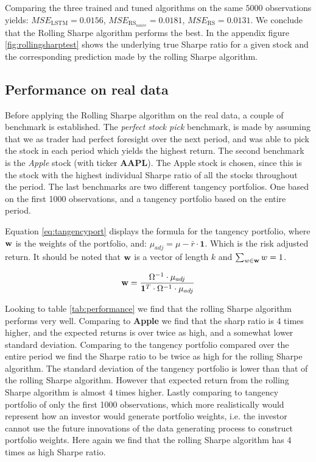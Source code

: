 Comparing the three trained and tuned algorithms on the same $5000$ observations yields: $MSE_{\text{LSTM}}= 0.0156$, $MSE_{\text{RS}_{naive}}= 0.0181$, $MSE_{\text{RS}}= 0.0131$. We conclude that the Rolling Sharpe algorithm performs the best. In the appendix figure \ref{fig:rollingsharptest} shows the underlying true Sharpe ratio for a given stock and the corresponding prediction made by the rolling Sharpe algorithm.


\subsection{Performance on real data}

Before applying the Rolling Sharpe algorithm on the real data, a couple of benchmark is established. The \textit{perfect stock pick} benchmark, is made by assuming that we as trader had perfect foresight over the next period, and was able to pick the stock in each period which yields the highest return. The second benchmark is the \textit{Apple} stock (with ticker \textbf{AAPL}). The Apple stock is chosen, since this is the stock with the highest individual Sharpe ratio of all the stocks throughout the period. The last benchmarks are two different tangency portfolios. One based on the first 1000 observations, and a tangency portfolio based on the entire period.

Equation \ref{eq:tangencyport} displays the formula for the tangency portfolio, where $\mathbf{w}$ is the weights of the portfolio, and: $\mu_{adj} = \mu - \bar{r}\cdot \mathbf{1}$. Which is the risk adjusted return. It should be noted that $\mathbf{w}$ is a vector of length $k$ and $\sum_{w \in \mathbf{w}} w = 1$.

\begin{equation}\label{eq:tangencyport}
    \mathbf{w} = \frac{\Omega^{-1} \cdot \mu_{adj}}{\mathbf{1}^{T} \cdot \Omega^{-1} \cdot \mu_{adj}}
\end{equation}

Looking to table \ref{tab:performance} we find that the rolling Sharpe algorithm performs very well. Comparing to \textbf{Apple} we find that the sharp ratio is 4 times higher, and the expected returns is over twice as high, and a somewhat lower standard deviation. Comparing to the tangency portfolio compared over the entire period we find the Sharpe ratio to be twice as high for the rolling Sharpe algorithm. The standard deviation of the tangency portfolio is lower than that of the rolling Sharpe algorithm. However that expected return from the rolling Sharpe algorithm is almost 4 times higher. Lastly comparing to tangency portfolio of only the first 1000 observations, which more realistically would represent how an investor would generate portfolio weights, i.e. the investor cannot use the future innovations of the data generating process to construct portfolio weights. Here again we find that the rolling Sharpe algorithm has 4 times as high Sharpe ratio.

